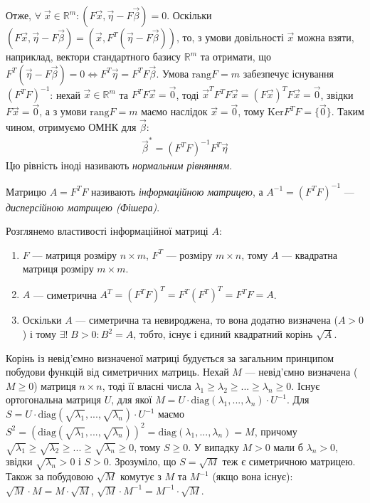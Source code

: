 Отже, $\forall\; \vec{x} \in \mathbb{R}^m: \left(F\vec{x}, \vec{\eta} - F \vec{\beta}\right) = 0$.
Оскільки $\left(F\vec{x}, \vec{\eta} - F \vec{\beta}\right) = \left(\vec{x}, F^T (\vec{\eta} - F \vec{\beta})\right)$,
то, з умови довільності $\vec{x}$ можна взяти, наприклад, вектори стандартного базису $\mathbb{R}^m$ та
отримати, що $F^T (\vec{\eta} - F \vec{\beta}) = 0 \Leftrightarrow F^T \vec{\eta} = F^T F \vec{\beta}$.
Умова $\mathrm{rang}{F} = m$ забезпечує існування $(F^T F)^{-1}$: нехай $\vec{x} \in \mathbb{R}^m$ та 
$F^T F \vec{x} = \vec{0}$, тоді $\vec{x}^T F^T F \vec{x} = (F\vec{x})^T F\vec{x} = \vec{0}$,
звідки $F\vec{x} = \vec{0}$, а з умови $\mathrm{rang}{F} = m$ маємо наслідок $\vec{x} = \vec{0}$,
тому $\mathrm{Ker} F^T F = \{ \vec{0}\}$.
Таким чином, отримуємо ОМНК для $\vec{\beta}$:
\begin{gather}\label{regr_coef}
    \vec{\beta}^* = (F^T F)^{-1} F^T \vec{\eta}
\end{gather}
Цю рівність іноді називають \emph{нормальним рівнянням}.
\begin{definition}
    Матрицю $A = F^T F$ називають \emph{інформаційною матрицею}, а $A^{-1} = 
    (F^T F)^{-1}$ --- \emph{дисперсійною матрицею (Фішера)}.
\end{definition}
Розглянемо властивості інформаційної матриці $A$:
\begin{enumerate}
    \item $F$ --- матриця розміру $n \times m$, $F^T$ --- розміру $m \times n$, тому
    $A$ --- квадратна матриця розміру $m \times m$.
    \item $A$ --- симетрична $A^T = (F^T F)^T = F^T (F^T)^T = F^T F = A$.
    \item Оскільки $A$ --- симетрична та невироджена, то вона додатно визначена ($A > 0$) і тому $\exists! \; B > 0 :  B^2 = A$,
    тобто, існує і єдиний квадратний корінь $\sqrt{A}$.
\end{enumerate}
\begin{remark}
    Корінь із невід'ємно визначеної матриці будується за загальним принципом побудови функцій від симетричних матриць.
    Нехай $M$ --- невід'ємно визначена ($M \geq 0$) матриця $n \times n$, тоді її власні числа $\lambda_1 \geq \lambda_2 \geq ... \geq \lambda_n \geq 0$.
    Існує ортогональна матриця $U$, для якої $M = U \cdot \mathrm{diag}(\lambda_1, ..., \lambda_n) \cdot U^{-1}$.
    Для $S = U \cdot \mathrm{diag}(\sqrt{\lambda_1}, ..., \sqrt{\lambda_n}) \cdot U^{-1}$ маємо
    $S^2 = \left(\mathrm{diag}(\sqrt{\lambda_1}, ..., \sqrt{\lambda_n})\right)^2 = \mathrm{diag}(\lambda_1, ..., \lambda_n) = M$,
    причому $\sqrt{\lambda_1} \geq \sqrt{\lambda_2} \geq ... \geq \sqrt{\lambda_n} \geq 0$, тому $S \geq 0$. У випадку $M>0$
    мали б $\lambda_n > 0$, звідки $\sqrt{\lambda_n} > 0$ і $S > 0$. Зрозуміло, що $S = \sqrt{M}$ теж є симетричною матрицею. Також за побудовою
    $\sqrt{M}$ комутує з $M$ та $M^{-1}$ (якщо вона існує): $\sqrt{M} \cdot M = M \cdot \sqrt{M}$, $\sqrt{M} \cdot M^{-1} = M^{-1} \cdot \sqrt{M}$. 
\end{remark}
